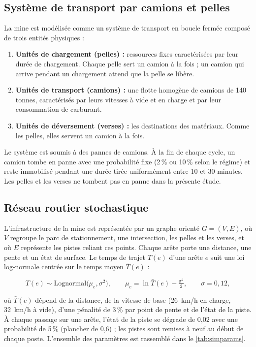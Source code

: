\documentclass[11pt,a4paper]{article}
\newif\ifrevmarks
\newcommand{\revtag}[1]{\ifrevmarks\textsuperscript{\textcolor{red!70!black}{\scriptsize[#1]}}\fi}
\newcommand{\rev}[2]{\ifrevmarks{\color{revcolor}#2}\revtag{#1}\else#2\fi}
\begin{document}
\subsection{Système de transport par camions et pelles}
\label{sec:system}

La mine est modélisée comme un système de transport en boucle fermée composé de trois entités physiques :

\begin{enumerate}
  \item \textbf{Unités de chargement (pelles) :} ressources fixes caractérisées par leur durée de chargement. Chaque pelle sert un camion à la fois ; un camion qui arrive pendant un chargement attend que la pelle se libère.
  \item \textbf{Unités de transport (camions) :} une flotte homogène de camions de 140 tonnes, caractérisés par leurs vitesses à vide et en charge et par leur consommation de carburant.
  \item \textbf{Unités de déversement (verses) :} les destinations des matériaux. Comme les pelles, elles servent un camion à la fois.
\end{enumerate}

\rev{M11, N5}{Le système est soumis à des pannes de camions. À la fin de chaque cycle, un camion tombe en panne avec une probabilité fixe (2\,\% ou 10\,\% selon le régime) et reste immobilisé pendant une durée tirée uniformément entre 10 et 30 minutes. Les pelles et les verses ne tombent pas en panne dans la présente étude.}

\subsection{Réseau routier stochastique}

L'infrastructure de la mine est représentée par un graphe orienté $G = (V, E)$, où $V$ regroupe le parc de stationnement, une intersection, les pelles et les verses, et où $E$ représente les pistes reliant ces points. \rev{M11}{Chaque arête porte une distance, une pente et un état de surface. Le temps de trajet $T(e)$ d'une arête $e$ suit une loi log-normale centrée sur le temps moyen $\bar T(e)$ :}

\begin{equation}
T(e) \sim \mathrm{Lognormal}\big(\mu_e, \sigma^2\big), \qquad \mu_e = \ln \bar T(e) - \tfrac{\sigma^2}{2}, \qquad \sigma = 0{,}12 ,
\end{equation}

\rev{M11}{où $\bar T(e)$ dépend de la distance, de la vitesse de base (26~km/h en charge, 32~km/h à vide), d'une pénalité de 3\,\% par point de pente et de l'état de la piste. À chaque passage sur une arête, l'état de la piste se dégrade de 0,02 avec une probabilité de 5\,\% (plancher de 0,6) ; les pistes sont remises à neuf au début de chaque poste. L'ensemble des paramètres est rassemblé dans le \cref{tab:simparams}.}
\end{document}
